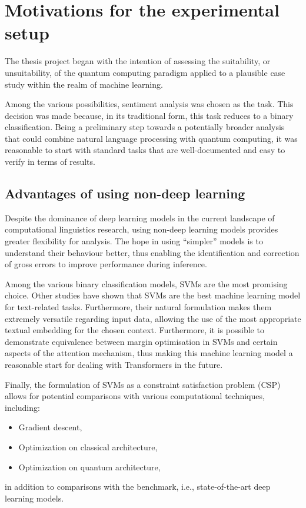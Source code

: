 \chapter{Motivations for the experimental setup}

The thesis project began with the intention of assessing the suitability, or unsuitability, of the quantum computing paradigm applied to a plausible case study within the realm of machine learning.

Among the various possibilities, sentiment analysis was chosen as the task. This decision was made because, in its traditional form, this task reduces to a binary classification. Being a preliminary step towards a potentially broader analysis that could combine natural language processing with quantum computing, it was reasonable to start with standard tasks that are well-documented and easy to verify in terms of results.

\section{Advantages of using non-deep learning}

Despite the dominance of deep learning models in the current landscape of computational linguistics research, using non-deep learning models provides greater flexibility for analysis. The hope in using ``simpler'' models is to understand their behaviour better, thus enabling the identification and correction of gross errors to improve performance during inference.

Among the various binary classification models, SVMs are the most promising choice. Other studies have shown that SVMs are the best machine learning model for text-related tasks\cite{ML4NLP}. Furthermore, their natural formulation makes them extremely versatile regarding input data, allowing the use of the most appropriate textual embedding for the chosen context. Furthermore, it is possible to demonstrate equivalence between margin optimisation in SVMs and certain aspects of the attention mechanism\cite{TransformerSVM}, thus making this machine learning model a reasonable start for dealing with Transformers in the future.

Finally, the formulation of SVMs as a constraint satisfaction problem (CSP) allows for potential comparisons with various computational techniques, including:

\begin{itemize}
    \item Gradient descent,
	\item Optimization on classical architecture,
	\item Optimization on quantum architecture,
\end{itemize}
in addition to comparisons with the benchmark, i.e.,  state-of-the-art deep learning models.

